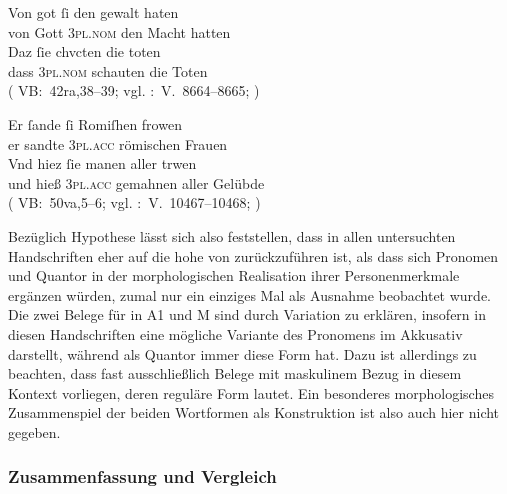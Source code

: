 \begin{exe}
\ex \label{ex:vbsisie}
 	\begin{xlist}
 	\ex \gll Von got ſi den gewalt haten \\
		     von Gott \textsc{3pl\subM.nom} den Macht hatten \\
 	\sn \gll Daz ſie chvcten die toten \\
		     dass \textsc{3pl\subM.nom} schauten die Toten \\
		\trans {}
			(%
				VB:~42ra,38--39; vgl.
				\KC:~V.~8664--8665;
				\cite[241]{schroeder1895}%
			)
 		\label{ex:vbsisie_1}

	\ex \gll Er ſande ſi Romiſhen frowen \\
		     er sandte \textsc{3pl\subI.acc} römischen Frauen \\
	\sn \gll Vnd hiez ſie manen aller trwen \\
		     und hieß \textsc{3pl\subF.acc} gemahnen aller Gelübde \\
		\trans {}
			(%
				VB:~50va,5--6; vgl.
				\KC:~V.~10467--10468;
				\cite[273]{schroeder1895}%
			)
		\label{ex:vbsisie_2}
	\end{xlist}%
\end{exe}

Bezüglich  Hypothese lässt sich also feststellen, dass
 in allen unter\-suchten Handschriften eher auf die hohe
 von  zurückzuführen ist, als dass sich Pro\-nomen und
Quantor in der morphologischen Realisation ihrer Personenmerkmale ergänzen
würden, zumal  nur ein einziges Mal als Ausnahme
beobachtet wurde. Die zwei Belege für  in A1 und M sind durch
Variation zu erklären, insofern  in diesen Handschriften eine
mög\-liche Variante des Pronomens im Akkusativ darstellt, während 
als Quantor immer diese Form hat. Dazu ist allerdings zu beachten, dass fast
ausschließlich Belege mit maskulinem Bezug in diesem Kontext vorliegen, deren
reguläre Form  lautet. Ein besonderes morphologisches Zusammenspiel
der beiden Wortformen als Konstruktion ist also auch hier nicht gegeben.


\subsubsection{Zusammenfassung und Vergleich}
\label{subsubsec:persfeatsmry}

